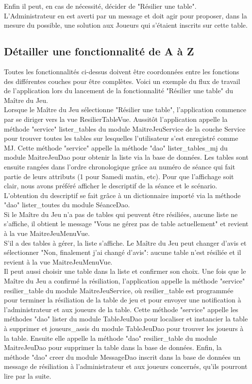 \documentclass[11pt]{article}
\begin{document}
Enfin il peut, en cas de nécessité, décider de "Résilier une table". L'Administrateur en est averti par un message et doit agir pour proposer, dans la mesure du possible, une solution aux Joueurs qui s'étaient inscrits sur cette table.\\


\subsection{Détailler une fonctionnalité de A à Z}
Toutes les fonctionnalités ci-dessus doivent être coordonnées entre les fonctions des différentes couches pour être complètes. Voici un exemple du flux de travail de l'application lors du lancement de la fonctionnalité "Résilier une table" du Maître du Jeu.\\

Lorsque le Maître du Jeu sélectionne "Résilier une table", l'application commence par se diriger vers la vue ResilierTableVue. Aussitôt l'application appelle la méthode "service" lister\_tables du module MaitreJeuService de la couche Service pour trouver toutes les tables sur lesquelles l'utilisateur s'est enregistré comme MJ. Cette méthode "service" appelle la méthode "dao" lister\_tables\_mj du module MaitreJeuDao pour obtenir la liste via la base de données. Les tables sont ensuite rangées dans l'ordre chronologique grâce au numéro de séance qui fait partie de leurs attributs (1 pour Samedi matin, etc). Pour que l'affichage soit clair, nous avons préféré afficher le descriptif de la séance et le scénario. L'obtention du descriptif se fait grâce à un dictionnaire importé via la méthode "dao" lister\_toutes du module SéanceDao.\\

Si le Maître du Jeu n'a pas de tables qui peuvent être résiliées, aucune liste ne s'affiche, il obtient le message "Vous ne gérez pas de table actuellement" et revient à la vue MaitreJeuMenuVue.\\

S'il a des tables à gérer, la liste s'affiche. Le Maître du Jeu peut changer d'avis et sélectionner "Non, finalement j'ai changé d'avis": aucune table n'est résiliée et il revient à la vue MaitreJeuMenuVue.\\

Il peut aussi choisir une table dans la liste et confirmer son choix. Une fois que le Maître du Jeu a confirmé la résiliation, l'application appelle la méthode "service" resilier\_table du module MaitreJeuService, où resilier\_table est programmée pour terminer la résiliation de la table de jeu et pour envoyer une notification à l'administrateur et aux joueurs de la table. Cette méthode "service" appelle les méthodes "dao" lister du module TableJeuDao pour localiser et instancier la table à supprimer et joueurs\_assis du module TableJeuDao pour trouver les joueurs à la table. Ensuite elle appelle la méthode "dao" resilier\_table du module MaitreJeuDao pour supprimer la table dans la base de données. Enfin, la méthode "dao" creer du module MessageDao inscrit dans la base de données un message de résiliation à l'administrateur et aux joueurs concernés, qu'ils pourront lire par la suite.\\
\end{document}
